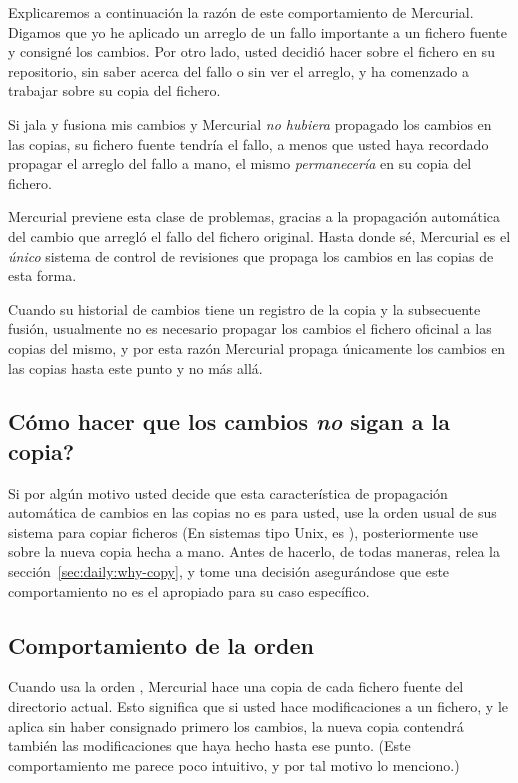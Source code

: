 Explicaremos a continuación la razón de este comportamiento de
Mercurial. Digamos que yo he aplicado un arreglo de un fallo importante a un
fichero fuente y consigné los cambios.  Por otro lado, usted decidió hacer
 sobre el fichero en su repositorio, sin saber acerca del
fallo o sin ver el arreglo, y ha comenzado a trabajar sobre su copia
del fichero.

Si jala y fusiona mis cambios y Mercurial \emph{no hubiera} propagado
los cambios en las copias, su fichero fuente tendría el fallo, a menos
que usted haya recordado propagar el arreglo del fallo a mano, el
mismo \emph{permanecería} en su copia del fichero.

Mercurial previene esta clase de problemas, gracias a la propagación
automática del cambio que arregló el fallo del fichero original. Hasta
donde sé, Mercurial es el \emph{único} sistema de control de
revisiones que propaga los cambios en las copias de esta forma.

Cuando su historial de cambios tiene un registro de la copia y la
subsecuente fusión, usualmente no es necesario propagar los cambios el
fichero oficinal a las copias del mismo, y por esta razón Mercurial
propaga únicamente los cambios en las copias hasta este punto y no más
allá.


\subsection{Cómo hacer que los cambios \emph{no} sigan a la copia?}

Si por algún motivo usted decide que esta característica de
propagación automática de cambios en las copias no es para usted, use
la orden usual de sus sistema para copiar ficheros (En sistemas tipo
Unix, es ), posteriormente use  sobre la nueva
copia hecha a mano.  Antes de hacerlo, de todas maneras, relea la
sección~\ref{sec:daily:why-copy}, y tome una decisión asegurándose que
este comportamiento no es el apropiado para su caso específico.

\subsection{Comportamiento de la orden }

Cuando usa la orden , Mercurial hace una copia de cada
fichero fuente del directorio actual. Esto significa que si usted hace
modificaciones a un fichero, y le aplica  sin haber
consignado primero los cambios, la nueva copia contendrá también las
modificaciones que haya hecho hasta ese punto. (Este comportamiento me
parece poco intuitivo, y por tal motivo lo menciono.)


